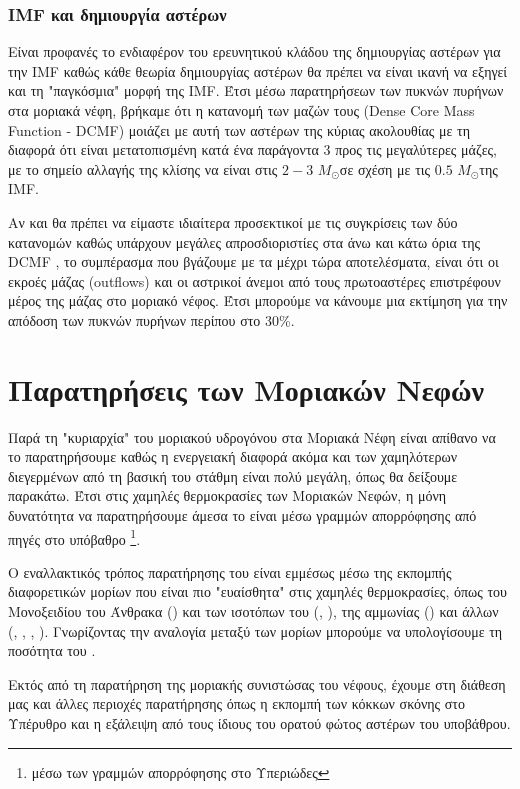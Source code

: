 \documentclass[a4paper,12pt]{memoir}
\newcommand{\sm}{$M_{\odot}$}
\begin{document}
\subsubsection{IMF και δημιουργία αστέρων}
Είναι προφανές το ενδιαφέρον του ερευνητικού κλάδου της δημιουργίας αστέρων για την IMF καθώς κάθε θεωρία δημιουργίας αστέρων θα πρέπει να είναι ικανή να εξηγεί και τη "παγκόσμια" μορφή της IMF.
Έτσι μέσω παρατηρήσεων των πυκνών πυρήνων στα μοριακά νέφη, βρήκαμε ότι η κατανομή των μαζών τους (Dense Core Mass Function - DCMF) μοιάζει με αυτή των αστέρων της κύριας ακολουθίας με τη διαφορά ότι είναι μετατοπισμένη κατά ένα παράγοντα $3$ προς τις μεγαλύτερες μάζες, με το σημείο αλλαγής της κλίσης να είναι στις $2-3$ \sm σε σχέση με τις $0.5$ \sm της IMF. 

Αν και θα πρέπει να είμαστε ιδιαίτερα προσεκτικοί με τις συγκρίσεις των δύο κατανομών καθώς υπάρχουν μεγάλες απροσδιοριστίες στα άνω και κάτω όρια της DCMF \cite{polychroni__2010}, το συμπέρασμα που βγάζουμε με τα μέχρι τώρα αποτελέσματα, είναι ότι οι εκροές μάζας (outflows) και οι αστρικοί άνεμοι από τους πρωτοαστέρες επιστρέφουν μέρος της μάζας στο μοριακό νέφος. Έτσι μπορούμε να κάνουμε μια εκτίμηση για την απόδοση των πυκνών πυρήνων περίπου στο 30\%.



\section{Παρατηρήσεις των Μοριακών Νεφών}
\label{par:H2}
Παρά τη "κυριαρχία" του μοριακού υδρογόνου στα Μοριακά Νέφη είναι απίθανο να το παρατηρήσουμε καθώς η ενεργειακή διαφορά ακόμα και των χαμηλότερων διεγερμένων από τη βασική του στάθμη είναι πολύ μεγάλη, όπως θα δείξουμε παρακάτω. Έτσι στις χαμηλές θερμοκρασίες των Μοριακών Νεφών, η μόνη δυνατότητα να παρατηρήσουμε άμεσα το  είναι μέσω γραμμών απορρόφησης από πηγές στο υπόβαθρο \footnote{μέσω των γραμμών απορρόφησης στο Υπεριώδες}. 

Ο εναλλακτικός τρόπος παρατήρησης του  είναι εμμέσως μέσω της εκπομπής διαφορετικών μορίων που είναι πιο "ευαίσθητα" στις χαμηλές θερμοκρασίες, όπως του Μονοξειδίου του Άνθρακα () και των ισοτόπων του (, ), της αμμωνίας () και άλλων (, , , ).
Γνωρίζοντας την αναλογία μεταξύ των μορίων μπορούμε να υπολογίσουμε τη ποσότητα του .

Εκτός από τη παρατήρηση της μοριακής συνιστώσας του νέφους, έχουμε στη διάθεση μας και άλλες περιοχές παρατήρησης όπως η εκπομπή των κόκκων σκόνης στο Υπέρυθρο και η εξάλειψη από τους ίδιους του ορατού φώτος αστέρων του υποβάθρου.
\end{document}
